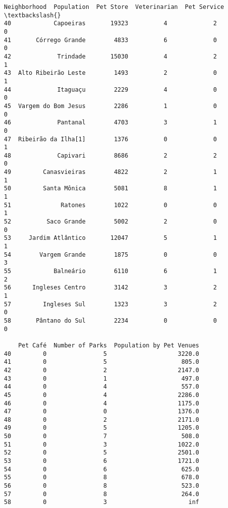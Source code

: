 \documentclass[11pt]{article}
\makeatletter
\newcommand{\boxspacing}{\kern\kvtcb@left@rule\kern\kvtcb@boxsep}
\newcommand{\prompt}[4]{
        \ttfamily\llap{{\color{#2}[#3]:\hspace{3pt}#4}}\vspace{-\baselineskip}
    }
\makeatother
\begin{document}
            \begin{tcolorbox}[breakable, size=fbox, boxrule=.5pt, pad at break*=1mm, opacityfill=0]
\prompt{Out}{outcolor}{35}{\boxspacing}
\begin{Verbatim}[commandchars=\\\{\}]
           Neighborhood  Population  Pet Store  Veterinarian  Pet Service  \textbackslash{}
40            Capoeiras       19323          4             2            0
41       Córrego Grande        4833          6             0            0
42             Trindade       15030          4             2            1
43  Alto Ribeirão Leste        1493          2             0            1
44             Itaguaçu        2229          4             0            0
45  Vargem do Bom Jesus        2286          1             0            0
46             Pantanal        4703          3             1            0
47  Ribeirão da Ilha[1]        1376          0             0            1
48             Capivari        8686          2             2            0
49         Canasvieiras        4822          2             1            1
50         Santa Mônica        5081          8             1            1
51              Ratones        1022          0             0            1
52          Saco Grande        5002          2             0            0
53     Jardim Atlântico       12047          5             1            1
54        Vargem Grande        1875          0             0            3
55            Balneário        6110          6             1            2
56      Ingleses Centro        3142          3             2            1
57         Ingleses Sul        1323          3             2            0
58       Pântano do Sul        2234          0             0            0

    Pet Café  Number of Parks  Population by Pet Venues
40         0                5                    3220.0
41         0                5                     805.0
42         0                2                    2147.0
43         0                1                     497.0
44         0                4                     557.0
45         0                4                    2286.0
46         0                4                    1175.0
47         0                0                    1376.0
48         0                2                    2171.0
49         0                5                    1205.0
50         0                7                     508.0
51         0                3                    1022.0
52         0                5                    2501.0
53         0                6                    1721.0
54         0                6                     625.0
55         0                8                     678.0
56         0                8                     523.0
57         0                8                     264.0
58         0                3                       inf
\end{Verbatim}
\end{tcolorbox}
        
\end{document}

